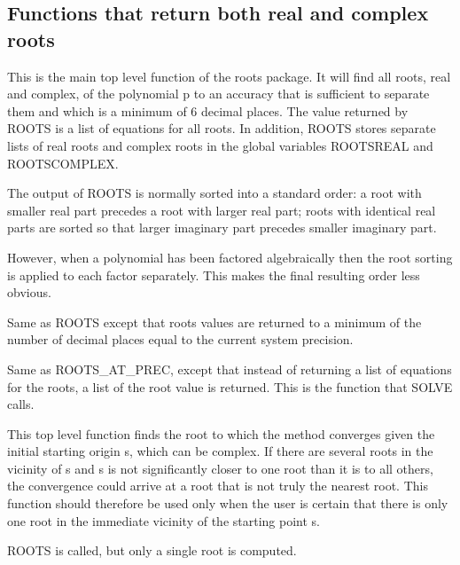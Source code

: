 \subsection{Functions that return both real and complex roots}

\begin{description}
\item[ROOTS p;] This is the main top level function of the roots package.
It will find all roots, real and complex, of the polynomial p to an
accuracy that is sufficient to separate them and which is a minimum of 6
decimal places.  The value returned by ROOTS is a
list of equations for all roots.  In addition, ROOTS stores separate lists
of real roots and complex roots in the global variables ROOTSREAL and
ROOTSCOMPLEX.

The output of ROOTS is normally sorted into a standard order:
a root with smaller real part precedes a root with larger real part; roots
with identical real parts are sorted so that larger imaginary part
precedes smaller imaginary part.

However, when a polynomial has been factored algebraically then the
root sorting is applied to each factor separately.  This makes the
final resulting order less obvious.

\item[ROOTS\_AT\_PREC p;] Same as ROOTS except that roots values are
returned to a minimum of the number of decimal places equal to the current
system precision.

\item[ROOT\_VAL p;] Same as ROOTS\_AT\_PREC, except that instead of
returning a list of equations for the roots, a list of the root value is
returned.  This is the function that SOLVE calls.

\item[NEARESTROOT(p,s);] This top level function finds the root to
which the method converges given the initial starting origin s, which
can be complex.  If there are several roots in the vicinity of s and s
is not significantly closer to one root than it is to all others, the
convergence could arrive at a root that is not truly the nearest root.
This function should therefore be used only when the user is certain
that there is only one root in the immediate vicinity of the
starting point s.

\item[FIRSTROOT p;] ROOTS is called, but only a single root is computed.
\end{description}



